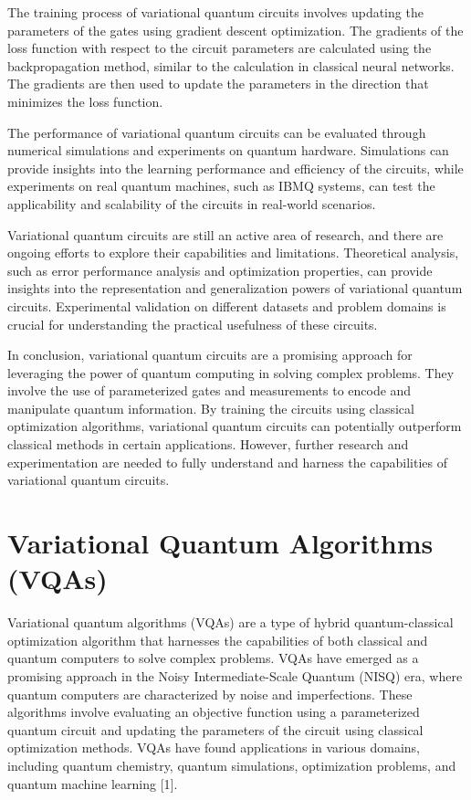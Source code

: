 \documentclass[inscr,ack,preface]{diphdthesis}
\begin{document}
The training process of variational quantum circuits involves updating the parameters of the gates using gradient descent optimization. The gradients of the loss function with respect to the circuit parameters are calculated using the backpropagation method, similar to the calculation in classical neural networks. The gradients are then used to update the parameters in the direction that minimizes the loss function.

The performance of variational quantum circuits can be evaluated through numerical simulations and experiments on quantum hardware. Simulations can provide insights into the learning performance and efficiency of the circuits, while experiments on real quantum machines, such as IBMQ systems, can test the applicability and scalability of the circuits in real-world scenarios.

Variational quantum circuits are still an active area of research, and there are ongoing efforts to explore their capabilities and limitations. Theoretical analysis, such as error performance analysis and optimization properties, can provide insights into the representation and generalization powers of variational quantum circuits. Experimental validation on different datasets and problem domains is crucial for understanding the practical usefulness of these circuits.

In conclusion, variational quantum circuits are a promising approach for leveraging the power of quantum computing in solving complex problems. They involve the use of parameterized gates and measurements to encode and manipulate quantum information. By training the circuits using classical optimization algorithms, variational quantum circuits can potentially outperform classical methods in certain applications. However, further research and experimentation are needed to fully understand and harness the capabilities of variational quantum circuits.

\section{Variational Quantum Algorithms (VQAs)}

Variational quantum algorithms (VQAs) are a type of hybrid quantum-classical optimization algorithm that harnesses the capabilities of both classical and quantum computers to solve complex problems. VQAs have emerged as a promising approach in the Noisy Intermediate-Scale Quantum (NISQ) era, where quantum computers are characterized by noise and imperfections. These algorithms involve evaluating an objective function using a parameterized quantum circuit and updating the parameters of the circuit using classical optimization methods. VQAs have found applications in various domains, including quantum chemistry, quantum simulations, optimization problems, and quantum machine learning [1].
\end{document}
